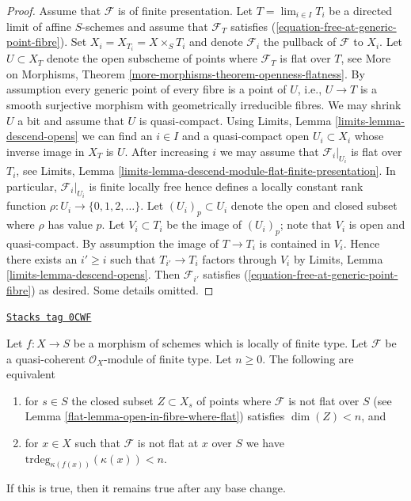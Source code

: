 \begin{proof}
\medskip\noindent
Assume that $\mathcal{F}$ is of finite presentation.
Let $T = \lim_{i \in I} T_i$ be a directed limit of affine $S$-schemes
and assume that $\mathcal{F}_T$ satisfies
(\ref{equation-free-at-generic-point-fibre}).
Set $X_i = X_{T_i} = X \times_S T_i$ and denote $\mathcal{F}_i$ the
pullback of $\mathcal{F}$ to $X_i$.
Let $U \subset X_T$ denote the open subscheme of points where
$\mathcal{F}_T$ is flat over $T$, see
More on Morphisms, Theorem \ref{more-morphisms-theorem-openness-flatness}.
By assumption every generic point of every fibre is a point of $U$, i.e.,
$U \to T$ is a smooth surjective morphism with geometrically irreducible
fibres. We may shrink $U$ a bit and assume that $U$ is quasi-compact.
Using
Limits, Lemma \ref{limits-lemma-descend-opens}
we can find an $i \in I$ and a quasi-compact open $U_i \subset X_i$
whose inverse image in $X_T$ is $U$. After increasing $i$ we may
assume that $\mathcal{F}_i|_{U_i}$ is flat over $T_i$, see
Limits, Lemma \ref{limits-lemma-descend-module-flat-finite-presentation}.
In particular, $\mathcal{F}_i|_{U_i}$ is finite locally free
hence defines a locally constant
rank function $\rho : U_i \to \{0, 1, 2, \ldots \}$.
Let $(U_i)_p \subset U_i$ denote the open and closed
subset where $\rho$ has value $p$. Let $V_i \subset T_i$ be the
image of $(U_i)_p$; note that $V_i$ is open and quasi-compact.
By assumption the image of $T \to T_i$ is contained in $V_i$.
Hence there exists an $i' \geq i$ such that $T_{i'} \to T_i$ factors
through $V_i$ by
Limits, Lemma \ref{limits-lemma-descend-opens}.
Then $\mathcal{F}_{i'}$ satisfies (\ref{equation-free-at-generic-point-fibre})
as desired. Some details omitted.
\end{proof}

\begin{lemma}
\label{flat-lemma-pre-flat-dimension-n}
\href{https://stacks.math.columbia.edu/tag/0CWF}{\texttt{Stacks tag 0CWF}}

Let $f : X \to S$ be a morphism of schemes which is locally of finite type.
Let $\mathcal{F}$ be a quasi-coherent $\mathcal{O}_X$-module of finite
type. Let $n \geq 0$. The following are equivalent
\begin{enumerate}
\item for $s \in S$ the closed subset $Z \subset X_s$ of points
where $\mathcal{F}$ is not flat over $S$ (see
Lemma \ref{flat-lemma-open-in-fibre-where-flat})
satisfies $\dim(Z) < n$, and
\item for $x \in X$ such that $\mathcal{F}$ is not flat at $x$
over $S$ we have $\text{trdeg}_{\kappa(f(x))}(\kappa(x)) < n$.
\end{enumerate}
If this is true, then it remains true after any base change.
\end{lemma}

